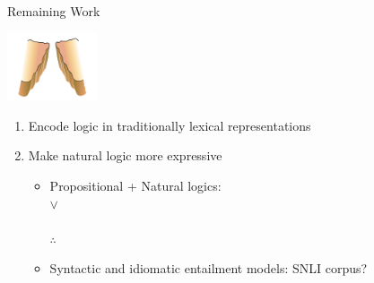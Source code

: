 %
%
\begin{frame}[noframenumbering]{Remaining Work}
\begin{center}
\includegraphics[height=2cm]{../img/chasm-close.png}
\end{center}
\vspace{-2ex}


\begin{enumerate}
\item Encode logic in traditionally lexical representations
  \cite{key:2013bowman-natlog,key:2015bowman-natlog}
\pause
\item Make natural logic more expressive
\pause
\begin{itemize}
  \item Propositional + Natural logics: \\
       \hspace{2ex} $\lor$  \\
       \hspace{2ex} \\
       \hspace{0ex}$\therefore$ 
  \pause
  \pause
  \item Syntactic and idiomatic entailment models: SNLI corpus?
\end{itemize}
\end{enumerate}
\end{frame}
